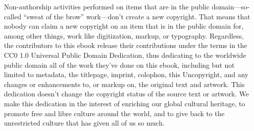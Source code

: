 Non-authorship activities performed on items that are in the public domain⁠—so-called “sweat of the brow” work⁠—don’t create a new copyright. That means that nobody can claim a new copyright on an item that is in the public domain for, among other things, work like digitization, markup, or typography. Regardless, the contributors to this ebook release their contributions under the terms in the CC0 1.0 Universal Public Domain Dedication, thus dedicating to the worldwide public domain all of the work they’ve done on this ebook, including but not limited to metadata, the titlepage, imprint, colophon, this Uncopyright, and any changes or enhancements to, or markup on, the original text and artwork. This dedication doesn’t change the copyright status of the source text or artwork. We make this dedication in the interest of enriching our global cultural heritage, to promote free and libre culture around the world, and to give back to the unrestricted culture that has given all of us so much.

\bye
